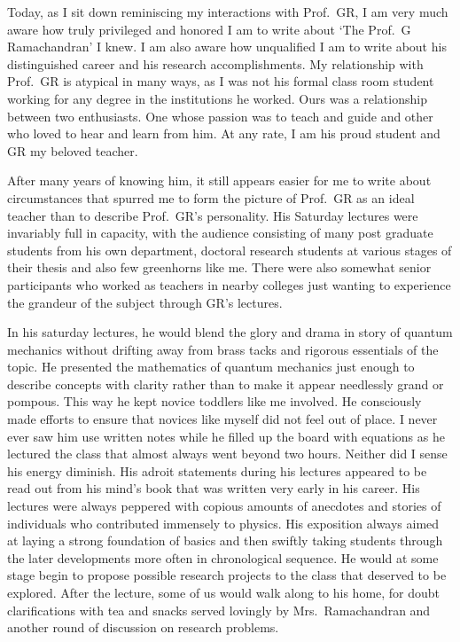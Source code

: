 Today, as I sit down reminiscing my interactions with Prof.\ GR, I am very much
aware how truly privileged and honored I am to write about `The Prof.\ G
Ramachandran' I knew. I am also aware how unqualified I am to write about his
distinguished career and his research accomplishments. My relationship with Prof.\ 
GR is atypical in many ways, as I was not his formal class room student working
for any degree in the institutions he worked. Ours was a relationship between two
enthusiasts. One whose passion was to teach and guide and other who loved to
hear and learn from him. At any rate, I am his proud student and GR my beloved
teacher.

After many years of knowing him, it still appears easier for me to write about
circumstances that spurred me to form the picture of Prof.\ GR as an
ideal teacher than to describe Prof.\ GR's personality. His Saturday lectures were
invariably full in capacity, with the audience consisting of many post graduate
students from his own department, doctoral research students at various stages of
their thesis and also few greenhorns like me. There were also somewhat senior
participants who worked as teachers in nearby colleges just wanting to experience
the grandeur of the subject through GR's lectures.

In his saturday lectures, he would blend the glory and drama in story of quantum
mechanics without drifting away from brass tacks and rigorous essentials of the
topic. He presented the mathematics of quantum mechanics just enough to
describe concepts with clarity rather than to make it appear needlessly grand or
pompous. This way he kept novice toddlers like me involved. He consciously
made efforts to ensure that novices like myself did not feel out of place. I never
ever saw him use written notes while he filled up the board with equations as he
lectured the class that almost always went beyond two hours. Neither did I sense
his energy diminish. His adroit statements during his lectures appeared to be read
out from his mind's book that was written very early in his career. His lectures
were always peppered with copious amounts of anecdotes and stories of
individuals who contributed immensely to physics. His exposition always aimed
at laying a strong foundation of basics and then swiftly taking students through
the later developments more often in chronological sequence. He would at some
stage begin to propose possible research projects to the class that deserved to be
explored. After the lecture, some of us would walk along to his home, for doubt
clarifications with tea and snacks served lovingly by Mrs.\ Ramachandran and
another round of discussion on research problems.

